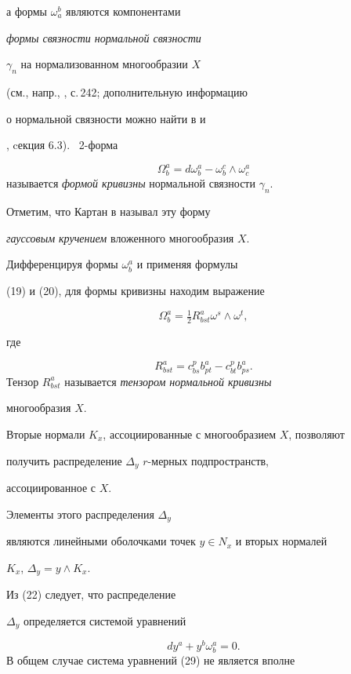 а формы $\omega_a^b$ являются компонентами


{\it формы связности нормальной связности}


$\gamma_n$ на нормализованном многообразии $X$


(см., напр., \cite{Ca01}, с.\,242; дополнительную информацию


о нормальной связности можно найти в \cite{AG95} и


\cite{AG93}, cекция 6.3). \ 2-форма


$$


\Omega_b^a = d \omega_b^a - \omega_b^c \wedge \omega_c^a


$$
называется {\it формой кривизны} нормальной связности $\gamma_n$.


 Отметим, что Картан в \cite{Ca01} называл эту форму


{\it гауссовым кручением} вложенного многообразия $X$.



Дифференцируя формы $\omega_b^a$ и применяя формулы


(19) и (20), для формы кривизны  находим выражение


$$


\Omega_b^a = \tfrac{1}{2}R^a_{bst} \omega^s \wedge \omega^t,


$$


где


\begin{equation}\label{eq:41}
R^a_{bst} = c_{bs}^p b^a_{pt}- c_{bt}^p b^a_{ps}.
\end{equation}
 Тензор $R^a_{bst}$ называется {\it тензором нормальной кривизны}


многообразия $X$.



Вторые нормали $K_x$, ассоциированные с многообразием $X$, позволяют


получить распределение $\Delta_y$ $r$-мерных подпространств,


ассоциированное с $X$.


 Элементы этого распределения $\Delta_y$


являются линейными оболочками точек $y \in N_x$ и вторых нормалей


$K_x$, $\Delta_y = y \wedge K_x$.


Из (22) следует, что распределение


$\Delta_y$ определяется системой уравнений


\begin{equation}\label{eq:42}
dy^a + y^b \omega^a_b = 0.
\end{equation}
В общем случае система уравнений (29) не является вполне


